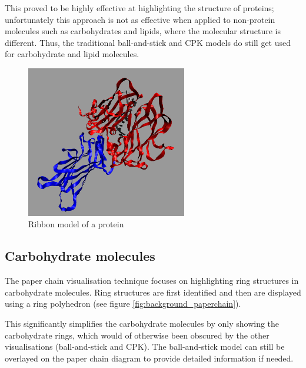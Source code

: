 This proved to be highly effective at highlighting the structure of proteins;
unfortunately this approach is not as effective when applied to non-protein
molecules such as carbohydrates and lipids, where the molecular structure is
different. Thus, the traditional ball-and-stick and CPK models do still get
used for carbohydrate and lipid molecules.

\begin{figure}[h!]
  \begin{center}
    \includegraphics[width=70mm]{ribbon}
  \end{center}
  \caption{Ribbon model of a protein}
  \label{fig:background_ribbon}
\end{figure}


\subsection{Carbohydrate molecules}
\label{sub:background_carbohydrate}

The paper chain visualisation technique \citep{kuttel06} focuses on
highlighting ring structures in carbohydrate molecules. Ring structures are
first identified and then are displayed using a ring polyhedron (see figure
\ref{fig:background_paperchain}).

This significantly simplifies the carbohydrate molecules by only showing the
carbohydrate rings, which would of otherwise been obscured by the other
visualisations (ball-and-stick and CPK). The ball-and-stick model can still be
overlayed on the paper chain diagram to provide detailed information if needed.

